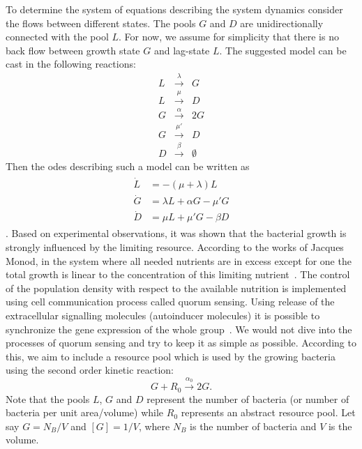 \documentclass[10pt,A4paper]{article}
\numberwithin{equation}{section}
\begin{document}
To determine the system of equations describing the system dynamics consider the flows between different states.
The pools $G$ and $D$ are unidirectionally connected with the pool $L$.
For now, we assume for simplicity that there is no back flow between growth state $G$ and lag-state $L$.
The suggested model can be cast in the following reactions:
\begin{eqnarray}
    L &\stackrel{\lambda}{\longrightarrow} & G\\
    L &\stackrel{\mu}{\longrightarrow} & D\\
    G &\stackrel{\alpha}{\longrightarrow} & 2G\\
    G &\stackrel{\mu'}{\longrightarrow} & D\\
    D &\stackrel{\beta}{\longrightarrow} & \emptyset
\end{eqnarray}
Then the \acp{ode} describing such a model can be written as
\begin{align}\begin{split}
    \dot{L} &= -(\mu + \lambda) L\\
    \dot{G} &= \lambda L + \alpha G - \mu' G\\
    \dot{D} &= \mu  L + \mu' G- \beta D  
\end{split}\end{align}.
%
Based on experimental observations, it was shown that the bacterial growth is strongly influenced by the limiting resource.
According to the works of Jacques Monod, in the system where all needed nutrients are in excess except for one the total growth is linear to the concentration of this limiting nutrient~\cite{monod_growth_1949}.
The control of the population density with respect to the available nutrition is implemented using cell communication process called quorum sensing.
Using release of the extracellular signalling molecules (autoinducer molecules) it is possible to synchronize the gene expression of the whole group~\cite{ng_bacterial_2009}.
We would not dive into the processes of quorum sensing and try to keep it as simple as possible.
According to this, we aim to include a resource pool which is used by the growing bacteria using the second order kinetic reaction:
\begin{equation}
    G + R_0  \stackrel{\alpha_0}{\longrightarrow} 2G.
\label{eq:reactions_resource}
\end{equation}
Note that the pools $L$, $G$ and $D$ represent the number of bacteria (or number of bacteria per unit area/volume) while $R_0$ represents an abstract resource pool.
Let say $G=N_B/V$ and $[G]=1/V$, where $N_B$ is the number of bacteria and $V$ is the volume.
\end{document}
